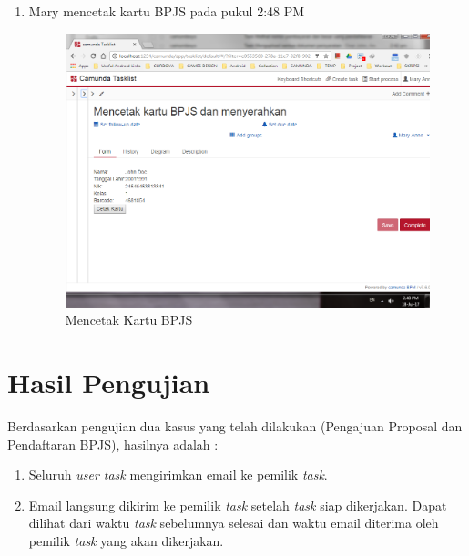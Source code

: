 \begin{enumerate}
	\item Mary mencetak kartu BPJS pada pukul 2:48 PM
			\begin{figure}[H]
			\centering
			\includegraphics[scale=0.5]{Gambar/Bab-5/kasus2/15}
			\caption{Mencetak Kartu BPJS} 
			\label{fig:pengujian_kasus2_15}
	\end{figure}
\end{enumerate}





		

\section{Hasil Pengujian}
\label{hasilpengujian}
Berdasarkan pengujian dua kasus yang telah dilakukan (Pengajuan Proposal dan Pendaftaran BPJS), hasilnya adalah :
\begin{enumerate}
	\item Seluruh \textit{user task} mengirimkan email ke pemilik \textit{task}.
	\item Email langsung dikirim ke pemilik \textit{task} setelah \textit{task} siap dikerjakan. Dapat dilihat dari waktu \textit{task} sebelumnya selesai dan waktu email diterima oleh pemilik \textit{task} yang akan dikerjakan.
\end{enumerate}